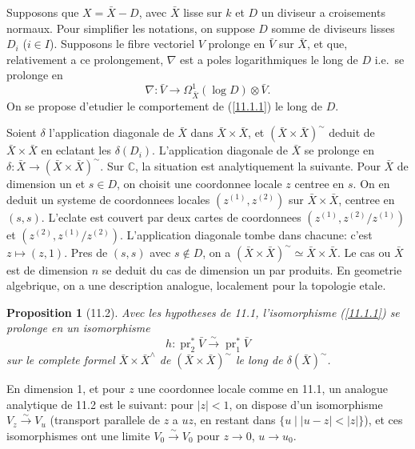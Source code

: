 \documentclass[12pt,a4paper]{article}
\theoremstyle{plain}
\newtheorem{proposition}[theorem]{Proposition}
\theoremstyle{definition}
\theoremstyle{remark}
\DeclareMathOperator{\pr}{pr}
\newcommand{\C}{\mathbb{C}}
\begin{document}
Supposons que $X = \bar{X} - D$, avec $\bar{X}$ lisse sur $k$ et $D$ un diviseur a croisements normaux. Pour simplifier les notations, on suppose $D$ somme de diviseurs lisses $D_i$ ($i \in I$). Supposons le fibre vectoriel $V$ prolonge en $\bar{V}$ sur $\bar{X}$, et que, relativement a ce prolongement, $\nabla$ est a poles logarithmiques le long de $D$ i.e.~se prolonge en
$$\nabla: \bar{V} \longrightarrow \Omega^1_{\bar{X}}(\log D) \otimes \bar{V}.$$
On se propose d'etudier le comportement de (\ref{11.1.1}) le long de $D$.

Soient $\delta$ l'application diagonale de $\bar{X}$ dans $\bar{X} \times \bar{X}$, et $(\bar{X} \times \bar{X})^\sim$ deduit de $\bar{X} \times \bar{X}$ en eclatant les $\delta(D_i)$. L'application diagonale de $\bar{X}$ se prolonge en $\delta: \bar{X} \to (\bar{X} \times \bar{X})^\sim$. Sur $\C$, la situation est analytiquement la suivante. Pour $\bar{X}$ de dimension un et $s \in D$, on choisit une coordonnee locale $z$ centree en $s$. On en deduit un systeme de coordonnees locales $(z^{(1)}, z^{(2)})$ sur $\bar{X} \times \bar{X}$, centree en $(s, s)$. L'eclate est couvert par deux cartes de coordonnees $(z^{(1)}, z^{(2)}/z^{(1)})$ et $(z^{(2)}, z^{(1)}/z^{(2)})$. L'application diagonale tombe dans chacune: c'est $z \mapsto (z, 1)$. Pres de $(s, s)$ avec $s \notin D$, on a $(\bar{X} \times \bar{X})^\sim \simeq \bar{X} \times \bar{X}$. Le cas ou $\bar{X}$ est de dimension $n$ se deduit du cas de dimension un par produits. En geometrie algebrique, on a une description analogue, localement pour la topologie etale.

\begin{proposition}[11.2]
Avec les hypotheses de 11.1, l'isomorphisme (\ref{11.1.1}) se prolonge en un isomorphisme
\begin{equation}\label{11.2.1}
h: \pr_2^* \bar{V} \xrightarrow{\sim} \pr_1^* \bar{V} \tag{11.2.1}
\end{equation}
sur le complete formel $\bar{X} \times \bar{X}^{\wedge}$ de $(\bar{X} \times \bar{X})^\sim$ le long de $\delta(\bar{X})^\sim$.
\end{proposition}

En dimension 1, et pour $z$ une coordonnee locale comme en 11.1, un analogue analytique de 11.2 est le suivant: pour $|z| < 1$, on dispose d'un isomorphisme $V_z \xrightarrow{\sim} V_u$ (transport parallele de $z$ a $uz$, en restant dans $\{u \mid |u-z| < |z|\}$), et ces isomorphismes ont une limite $V_0 \xrightarrow{\sim} V_0$ pour $z \to 0$, $u \to u_0$.
\end{document}
